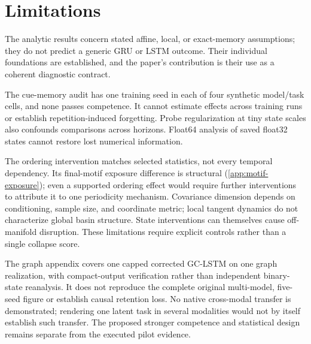 \section{Limitations}
\label{sec:limitations}

The analytic results concern stated affine, local, or exact-memory assumptions; they do not predict a generic GRU or LSTM outcome. Their individual foundations are established, and the paper's contribution is their use as a coherent diagnostic contract.

The cue-memory audit has one training seed in each of four synthetic model/task cells, and none passes competence. It cannot estimate effects across training runs or establish repetition-induced forgetting. Probe regularization at tiny state scales also confounds comparisons across horizons. Float64 analysis of saved float32 states cannot restore lost numerical information.

The ordering intervention matches selected statistics, not every temporal dependency. Its final-motif exposure difference is structural (\cref{app:motif-exposure}); even a supported ordering effect would require further interventions to attribute it to one periodicity mechanism. Covariance dimension depends on conditioning, sample size, and coordinate metric; local tangent dynamics do not characterize global basin structure. State interventions can themselves cause off-manifold disruption. These limitations require explicit controls rather than a single collapse score.

The graph appendix covers one capped corrected GC-LSTM on one graph realization, with compact-output verification rather than independent binary-state reanalysis. It does not reproduce the complete original multi-model, five-seed figure or establish causal retention loss. No native cross-modal transfer is demonstrated; rendering one latent task in several modalities would not by itself establish such transfer. The proposed stronger competence and statistical design remains separate from the executed pilot evidence.
